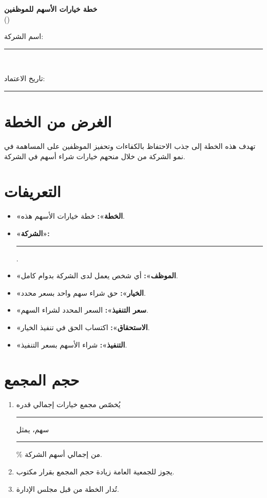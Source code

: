 \documentclass[11pt,a4paper]{article}
\begin{document}
\begin{center}
{\LARGE\bfseries خطة خيارات الأسهم للموظفين}\\[0.5em]
{\large ()}\\[1em]
{\normalsize اسم الشركة: \rule{6cm}{0.4pt}}\\[0.3em]
{\normalsize تاريخ الاعتماد: \rule{4cm}{0.4pt}}
\end{center}

\vspace{1.5em}

\section{الغرض من الخطة}
\label{sec:purpose}
تهدف هذه الخطة إلى جذب الاحتفاظ بالكفاءات وتحفيز الموظفين على المساهمة في نمو الشركة من خلال منحهم خيارات شراء أسهم في الشركة.

\section{التعريفات}
\label{sec:definitions}
\begin{itemize}
    \item \textbf{«الخطة»:} خطة خيارات الأسهم هذه.
    \item \textbf{«الشركة»:} \rule{6cm}{0.4pt}.
    \item \textbf{«الموظف»:} أي شخص يعمل لدى الشركة بدوام كامل.
    \item \textbf{«الخيار»:} حق شراء سهم واحد بسعر محدد.
    \item \textbf{«سعر التنفيذ»:} السعر المحدد لشراء السهم.
    \item \textbf{«الاستحقاق»:} اكتساب الحق في تنفيذ الخيار.
    \item \textbf{«التنفيذ»:} شراء الأسهم بسعر التنفيذ.
\end{itemize}

\section{حجم المجمع}
\label{sec:pool}
\begin{enumerate}
    \item يُخصّص مجمع خيارات إجمالي قدره \rule{3cm}{0.4pt} سهم، يمثل \rule{2cm}{0.4pt}\% من إجمالي أسهم الشركة.
    \item يجوز للجمعية العامة زيادة حجم المجمع بقرار مكتوب.
    \item تُدار الخطة من قبل مجلس الإدارة.
\end{enumerate}
\end{document}
